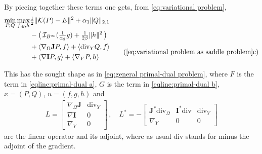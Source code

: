 \documentclass[journal,twoside,web]{ieeecolor}
\begin{document}
By piecing together these terms one gets, from \eqref{eq:variational problem},
\begin{subequations} \label{eq:variational problem as saddle problem}
\begin{align}
    \min_{P,Q} \max_{f,g,h} & \tfrac{1}{2} \| \mathcal{K}(P)-E\|^2 + \alpha_1\| Q \|_{2,1} \label{eqline:primal-dual a} \\
    & - \big(\, \mathcal{I}_{B^\infty}(\tfrac{1}{\alpha_2}g) + \tfrac{1}{2\beta}\|h\|^2 \,\big) \label{eqline:primal-dual b} \\
    &
    \begin{aligned}
        &+ \langle \nabla_\Omega\mathbf{J}P,f \rangle + \langle \mathrm{div}_Y Q, f \rangle \\
        &+ \langle \nabla \mathbf{I}P, g \rangle + \langle \nabla_Y P, h \rangle
    \end{aligned}
    \tag{\ref{eq:variational problem as saddle problem}c} \label{eqline:primal-dual c}
\end{align}
\end{subequations}

This has the sought shape as in \eqref{eq:general primal-dual problem}, where $F$ is the term in \eqref{eqline:primal-dual a}, $G$ is the term in \eqref{eqline:primal-dual b}, $x=(P,Q)$, $u=(f,g,h)$ and
\begin{align*}
    L =
    \begin{bmatrix}
        \nabla_\Omega \mathbf{J} & \mathrm{div}_Y \\
        \nabla \mathbf{I} & 0 \\
        \nabla_Y & 0
    \end{bmatrix} \, , \quad
    L^* = -
    \begin{bmatrix}
        \mathbf{J}^*\mathrm{div}_\Omega & \mathbf{I}^*\mathrm{div} & \mathrm{div}_Y \\
        \nabla_Y & 0 & 0 
    \end{bmatrix}
\end{align*}
are the linear operator and its adjoint, where as usual $\mathrm{div}$ stands for minus the adjoint of the gradient.
\end{document}
